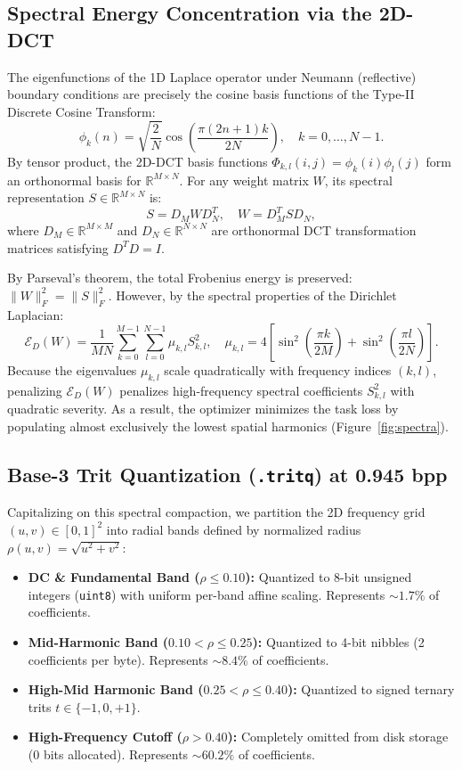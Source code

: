 \documentclass[11pt,a4paper]{article}
\begin{document}
\subsection{Spectral Energy Concentration via the 2D-DCT}
The eigenfunctions of the 1D Laplace operator under Neumann (reflective) boundary conditions are precisely the cosine basis functions of the Type-II Discrete Cosine Transform:
\begin{equation}
    \phi_k(n) = \sqrt{\frac{2}{N}} \cos\left(\frac{\pi (2n+1) k}{2N}\right), \quad k = 0, \dots, N-1.
\end{equation}
By tensor product, the 2D-DCT basis functions $\Phi_{k, l}(i, j) = \phi_k(i) \phi_l(j)$ form an orthonormal basis for $\mathbb{R}^{M \times N}$. For any weight matrix $W$, its spectral representation $S \in \mathbb{R}^{M \times N}$ is:
\begin{equation}
    S = D_M W D_N^T, \quad W = D_M^T S D_N,
\end{equation}
where $D_M \in \mathbb{R}^{M \times M}$ and $D_N \in \mathbb{R}^{N \times N}$ are orthonormal DCT transformation matrices satisfying $D^T D = I$.

By Parseval's theorem, the total Frobenius energy is preserved: $\|W\|_F^2 = \|S\|_F^2$. However, by the spectral properties of the Dirichlet Laplacian:
\begin{equation}
    \mathcal{E}_D(W) = \frac{1}{MN} \sum_{k=0}^{M-1} \sum_{l=0}^{N-1} \mu_{k, l} S_{k, l}^2, \quad \mu_{k, l} = 4 \left[ \sin^2\left(\frac{\pi k}{2M}\right) + \sin^2\left(\frac{\pi l}{2N}\right) \right].
\end{equation}
Because the eigenvalues $\mu_{k, l}$ scale quadratically with frequency indices $(k, l)$, penalizing $\mathcal{E}_D(W)$ penalizes high-frequency spectral coefficients $S_{k, l}^2$ with quadratic severity. As a result, the optimizer minimizes the task loss by populating almost exclusively the lowest spatial harmonics (Figure~\ref{fig:spectra}).

\subsection{Base-3 Trit Quantization (\texttt{.tritq}) at 0.945 bpp}
Capitalizing on this spectral compaction, we partition the 2D frequency grid $(u, v) \in [0, 1]^2$ into radial bands defined by normalized radius $\rho(u, v) = \sqrt{u^2 + v^2}$:
\begin{itemize}
    \item \textbf{DC \& Fundamental Band ($\rho \le 0.10$):} Quantized to 8-bit unsigned integers (\texttt{uint8}) with uniform per-band affine scaling. Represents $\sim 1.7\%$ of coefficients.
    \item \textbf{Mid-Harmonic Band ($0.10 < \rho \le 0.25$):} Quantized to 4-bit nibbles (2 coefficients per byte). Represents $\sim 8.4\%$ of coefficients.
    \item \textbf{High-Mid Harmonic Band ($0.25 < \rho \le 0.40$):} Quantized to signed ternary trits $t \in \{-1, 0, +1\}$.
    \item \textbf{High-Frequency Cutoff ($\rho > 0.40$):} Completely omitted from disk storage (0 bits allocated). Represents $\sim 60.2\%$ of coefficients.
\end{itemize}
\end{document}

